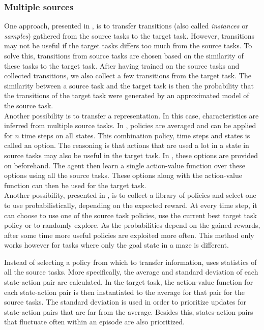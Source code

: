 \documentclass[a4paper]{article}
\begin{document}
\subsubsection{Multiple sources} %
\label{ssub:multiple_sources}
One approach, presented in \cite{lazaric2008transfer}, is to transfer transitions (also called \textit{instances} or \textit{samples}) gathered from the source tasks to the target task. However, transitions may not be useful if the target tasks differs too much from the source tasks. To solve this, transitions from source tasks are chosen based on the similarity of these tasks to the target task. After having trained on the source tasks and collected transitions, we also collect a few transitions from the target task. The similarity between a source task and the target task is then the probability that the transitions of the target task were generated by an approximated model of the source task.\\

Another possibility is to transfer a representation. In this case, characteristics are inferred from multiple source tasks.
In \cite{Bernstein99reusingold}, policies are averaged and can be applied for $n$ time steps on all states. This combination policy, time steps and states is called an option. The reasoning is that actions that are used a lot in a state in source tasks may also be useful in the target task. In \cite{perkins1999using}, these options are provided on beforehand. The agent then learn a single action-value function over these options using all the source tasks. These options along with the action-value function can then be used for the target task.\\
Another possibility, presented in \cite{fernandez2006probabilistic}, is to collect a library of policies and select one to use probabilistically, depending on the expected reward. At every time step, it can choose to use one of the source task policies, use the current best target task policy or to randomly explore. As the probabilities depend on the gained rewards, after some time more useful policies are exploited more often. This method only works however for tasks where only the goal state in a maze is different.

Instead of selecting a policy from which to transfer information, \cite{conf/cira/TanakaY03} uses statistics of all the source tasks. More specifically, the average and standard deviation of each state-action pair are calculated. In the target task, the action-value function for each state-action pair is then instantiated to the average for that pair for the source tasks. The standard deviation is used in order to prioritize updates for state-action pairs that are far from the average. Besides this, states-action pairs that fluctuate often within an episode are also prioritized.
\end{document}
